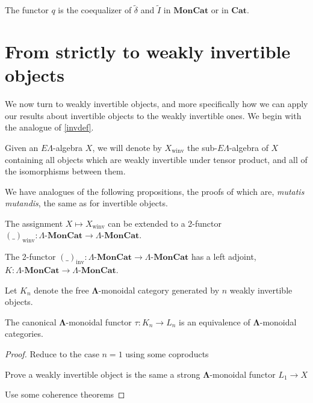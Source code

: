 \documentclass{amsbook} %
\newcommand{\mb}{\mathbf}
\newcommand{\ML}{\mathbf{\Lambda}}
\newcommand{\ELAlg}{\lmc}
\newcommand{\lmc}{\Lambda\mbox{-}\mb{MonCat}}
\newcommand{\moncat}{\ensuremath{\mb{MonCat}}}
\newcommand{\cat}{\ensuremath{\mb{Cat}}}
\numberwithin{section}{chapter}
\begin{document}
\begin{cor}\label{q_other_coeq2} The functor $q$  is the coequalizer of $\tilde{\delta}$ and $\tilde{I}$ in $\moncat$ or in $\cat$.
\end{cor}


\section{From strictly to weakly invertible objects}

We now turn to weakly invertible objects, and more specifically how we can apply our results about invertible objects to the weakly invertible ones. We begin with the analogue of \cref{invdef}.

\begin{Defi}\label{winvdef}
Given an $E\Lambda$-algebra $X$, we will denote by $X_{\mathrm{winv}}$ the sub-$E\Lambda$-algebra of $X$ containing all objects which are weakly invertible under tensor product, and all of the isomorphisms between them.
\end{Defi}

We have analogues of the following propositions, the proofs of which are, \textit{mutatis mutandis}, the same as for invertible objects.

\begin{prop} \label{winvprop} The assignment $X \mapsto X_{\mathrm{winv}}$ can be extended to a 2-functor $(\_)_{\mathrm{winv}}: \ELAlg \to \ELAlg$.
\end{prop}

\begin{prop} \label{winvadj} The 2-functor $(\_)_{\mathrm{inv}}: \ELAlg \to \ELAlg$ has a left adjoint, $K: \ELAlg \to \ELAlg$.
\end{prop}

\begin{Defi}\label{kn}
Let $K_n$ denote the free $\ML$-monoidal category generated by $n$ weakly invertible objects.
\end{Defi}


\begin{thm}\label{L_is_K}
The canonical $\ML$-monoidal functor $\tau:K_n \to L_n$ is an equivalence of $\ML$-monoidal categories.
\end{thm}
\begin{proof}
Reduce to the case $n=1$ using some coproducts

Prove a weakly invertible object is the same a strong $\ML$-monoidal functor $L_1 \to X$

Use some coherence theorems
\end{proof}
\end{document}
